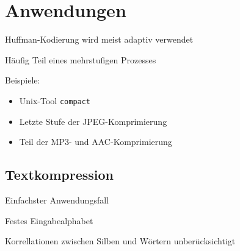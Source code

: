 \documentclass[xcolor=dvipsnames,presentation]{beamer}    %
\newenvironment{witemize}{\itemize\setlength{\itemsep}{1em}}{\enditemize}
\begin{document}
\begin{frame}{\insertsubsection}
\begin{figure}
\centering
{}
\end{figure}
\end{frame}

\section{Anwendungen}

\begin{frame}{\insertsection}
  \begin{witemize}
  \item Huffman-Kodierung wird meist adaptiv verwendet
  \item Häufig Teil eines mehrstufigen Prozesses
  \item Beispiele:
    \begin{itemize}
    \item Unix-Tool {\tt{compact}}
    \item Letzte Stufe der JPEG-Komprimierung
    \item Teil der MP3- und AAC-Komprimierung
    \end{itemize}
  \end{witemize}
\end{frame}

\subsection{Textkompression}

\begin{frame}{\insertsubsection}
  \begin{witemize}
  \item Einfachster Anwendungsfall
  \item Festes Eingabealphabet
  \item Korrellationen zwischen Silben und Wörtern unberücksichtigt
  \end{witemize}
\end{frame}
\end{document}
